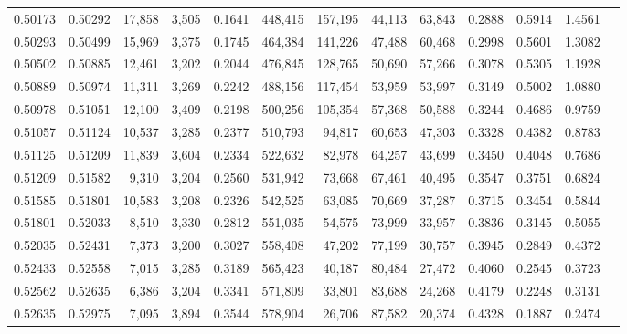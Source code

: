\begin{tabular}{rrrrrrrrrrrrr}
0.50173 & 0.50292 & 17,858 & 3,505 &                                     0.1641 & 448,415 & 157,195 &  44,113 &  63,843 & 0.2888 & 0.5914 & 1.4561 \\
0.50293 & 0.50499 & 15,969 & 3,375 &                                     0.1745 & 464,384 & 141,226 &  47,488 &  60,468 & 0.2998 & 0.5601 & 1.3082 \\
0.50502 & 0.50885 & 12,461 & 3,202 &                                     0.2044 & 476,845 & 128,765 &  50,690 &  57,266 & 0.3078 & 0.5305 & 1.1928 \\
0.50889 & 0.50974 & 11,311 & 3,269 &                                     0.2242 & 488,156 & 117,454 &  53,959 &  53,997 & 0.3149 & 0.5002 & 1.0880 \\
0.50978 & 0.51051 & 12,100 & 3,409 &                                     0.2198 & 500,256 & 105,354 &  57,368 &  50,588 & 0.3244 & 0.4686 & 0.9759 \\
0.51057 & 0.51124 & 10,537 & 3,285 &                                     0.2377 & 510,793 &  94,817 &  60,653 &  47,303 & 0.3328 & 0.4382 & 0.8783 \\
0.51125 & 0.51209 & 11,839 & 3,604 &                                     0.2334 & 522,632 &  82,978 &  64,257 &  43,699 & 0.3450 & 0.4048 & 0.7686 \\
0.51209 & 0.51582 &  9,310 & 3,204 &                                     0.2560 & 531,942 &  73,668 &  67,461 &  40,495 & 0.3547 & 0.3751 & 0.6824 \\
0.51585 & 0.51801 & 10,583 & 3,208 &                                     0.2326 & 542,525 &  63,085 &  70,669 &  37,287 & 0.3715 & 0.3454 & 0.5844 \\
0.51801 & 0.52033 &  8,510 & 3,330 &                                     0.2812 & 551,035 &  54,575 &  73,999 &  33,957 & 0.3836 & 0.3145 & 0.5055 \\
0.52035 & 0.52431 &  7,373 & 3,200 &                                     0.3027 & 558,408 &  47,202 &  77,199 &  30,757 & 0.3945 & 0.2849 & 0.4372 \\
0.52433 & 0.52558 &  7,015 & 3,285 &                                     0.3189 & 565,423 &  40,187 &  80,484 &  27,472 & 0.4060 & 0.2545 & 0.3723 \\
0.52562 & 0.52635 &  6,386 & 3,204 &                                     0.3341 & 571,809 &  33,801 &  83,688 &  24,268 & 0.4179 & 0.2248 & 0.3131 \\
0.52635 & 0.52975 &  7,095 & 3,894 &                                     0.3544 & 578,904 &  26,706 &  87,582 &  20,374 & 0.4328 & 0.1887 & 0.2474 \\

\end{tabular}
